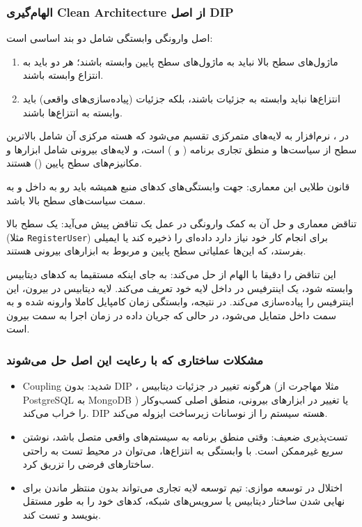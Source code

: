 \subsubsection*{الهام‌گیری Clean Architecture از اصل DIP}

اصل {وارونگی وابستگی} شامل دو بند اساسی است:
\begin{enumerate}
    \item ماژول‌های سطح بالا نباید به ماژول‌های سطح پایین وابسته باشند؛ هر دو باید به انتزاع وابسته باشند.
    \item انتزاع‌ها نباید وابسته به جزئیات باشند، بلکه جزئیات (پیاده‌سازی‌های واقعی) باید وابسته به انتزاع‌ها باشند.
\end{enumerate}

در ، نرم‌افزار به لایه‌های متمرکزی تقسیم می‌شود که هسته مرکزی آن شامل بالاترین سطح از سیاست‌ها و منطق تجاری برنامه ( و ) است، و لایه‌های بیرونی شامل ابزارها و مکانیزم‌های سطح پایین () هستند. 

قانون طلایی این معماری: جهت وابستگی‌های کدهای منبع همیشه باید رو به داخل و به سمت سیاست‌های سطح بالا باشد.

{تناقض معماری و حل آن به کمک وارونگی}
در عمل یک تناقض پیش می‌آید: یک  سطح بالا (مثلا \texttt{RegisterUser}) برای انجام کار خود نیاز دارد داده‌ای را ذخیره کند یا ایمیلی بفرستد، که این‌ها عملیاتی سطح پایین و مربوط به ابزارهای بیرونی هستند.

 این تناقض را دقیقا با الهام از  حل می‌کند:
به جای اینکه  مستقیما به کدهای دیتابیس وابسته شود، یک اینترفیس در داخل لایه خود تعریف می‌کند. لایه دیتابیس در بیرون، این اینترفیس را پیاده‌سازی می‌کند. در نتیجه، وابستگی زمان کامپایل کاملا {وارونه} شده و به سمت داخل متمایل می‌شود، در حالی که جریان داده در زمان اجرا به سمت بیرون است.







\subsubsection*{مشکلات ساختاری که با رعایت این اصل حل می‌شوند}
\begin{itemize}
    \item {Coupling شدید:} بدون DIP ، هرگونه تغییر در جزئیات دیتابیس (مثلا مهاجرت از PostgreSQL به MongoDB ) یا تغییر در ابزارهای بیرونی، منطق اصلی کسب‌وکار را خراب می‌کند. DIP هسته سیستم را از نوسانات زیرساخت ایزوله می‌کند.
    \item {تست‌پذیری ضعیف:} وقتی منطق برنامه به سیستم‌های واقعی متصل باشد، نوشتن  سریع غیرممکن است. با وابستگی به انتزاع‌ها، می‌توان در محیط تست به راحتی ساختارهای فرضی را تزریق کرد.
    \item {اختلال در توسعه موازی:} تیم توسعه لایه تجاری می‌تواند بدون منتظر ماندن برای نهایی شدن ساختار دیتابیس یا سرویس‌های شبکه، کدهای خود را به طور مستقل بنویسد و تست کند.
\end{itemize}

